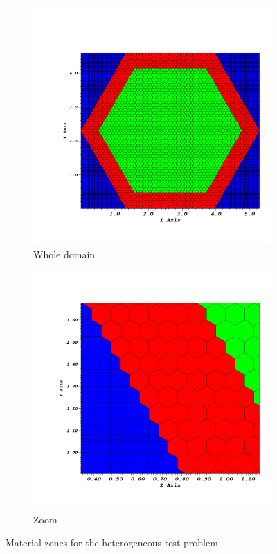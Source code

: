 \begin{figure}[!htbp]
  \centering
  \begin{subfigure}{0.45\textwidth}
    \centering
    \includegraphics[width=\textwidth]{hexa_grid0000}
    \caption{Whole domain}
  \end{subfigure}
  \begin{subfigure}{0.45\textwidth}
    \centering
    \includegraphics[width=\textwidth]{hexa_grid0001}
    \caption{Zoom}
  \end{subfigure}
  \caption{Material zones for the heterogeneous test problem}
  \label{hex_zones}
\end{figure}
